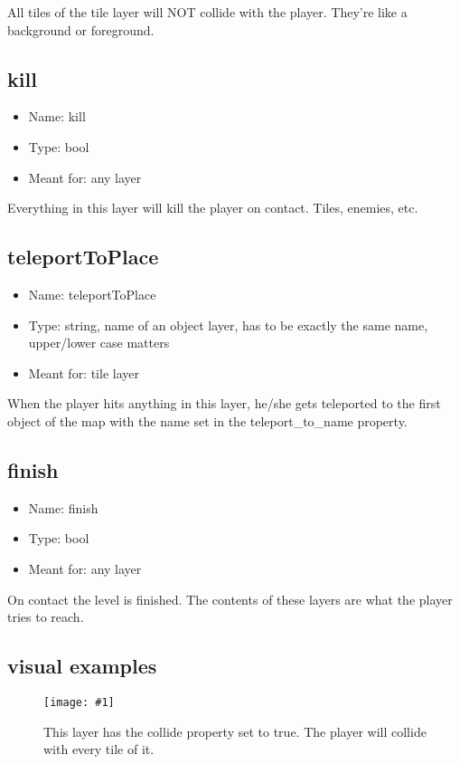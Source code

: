 \documentclass{article}
\newcommand{\erklaerbild}[2]{
	\begin{figure}[H]
		\center
		\texttt{[image: \#1]}
		\caption{#2}
	\end{figure}
}
\begin{document}
All tiles of the tile layer will NOT collide with the player. They're like a background or foreground.

\subsection{kill}
\begin{itemize}
	\item Name: kill
	\item Type: bool
	\item Meant for: any layer
\end{itemize}

Everything in this layer will kill the player on contact. Tiles, enemies, etc.

\subsection{teleportToPlace}
\begin{itemize}
	\item Name: teleportToPlace
	\item Type: string, name of an object layer, has to be exactly the same name, upper/lower case matters
	\item Meant for: tile layer
\end{itemize}

When the player hits anything in this layer, he/she gets teleported to the first object of the map with the name set in the teleport\_to\_name property.

\subsection{finish}
\begin{itemize}
	\item Name: finish
	\item Type: bool
	\item Meant for: any layer
\end{itemize}

On contact the level is finished. The contents of these layers are what the player tries to reach.

\subsection{visual examples}

\erklaerbild
	{custom_prop_collide.png}
	{This layer has the collide property set to true. The player will collide with every tile of it.}
\end{document}
